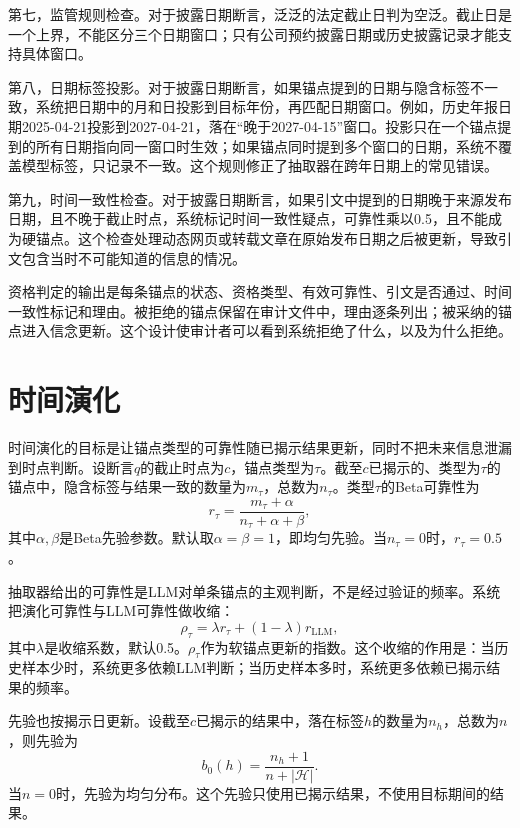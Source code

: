 第七，监管规则检查。对于披露日期断言，泛泛的法定截止日判为空泛。截止日是一个上界，不能区分三个日期窗口；只有公司预约披露日期或历史披露记录才能支持具体窗口。

第八，日期标签投影。对于披露日期断言，如果锚点提到的日期与隐含标签不一致，系统把日期中的月和日投影到目标年份，再匹配日期窗口。例如，历史年报日期2025-04-21投影到2027-04-21，落在“晚于2027-04-15”窗口。投影只在一个锚点提到的所有日期指向同一窗口时生效；如果锚点同时提到多个窗口的日期，系统不覆盖模型标签，只记录不一致。这个规则修正了抽取器在跨年日期上的常见错误。

第九，时间一致性检查。对于披露日期断言，如果引文中提到的日期晚于来源发布日期，且不晚于截止时点，系统标记时间一致性疑点，可靠性乘以0.5，且不能成为硬锚点。这个检查处理动态网页或转载文章在原始发布日期之后被更新，导致引文包含当时不可能知道的信息的情况。

资格判定的输出是每条锚点的状态、资格类型、有效可靠性、引文是否通过、时间一致性标记和理由。被拒绝的锚点保留在审计文件中，理由逐条列出；被采纳的锚点进入信念更新。这个设计使审计者可以看到系统拒绝了什么，以及为什么拒绝。

\section{时间演化}

时间演化的目标是让锚点类型的可靠性随已揭示结果更新，同时不把未来信息泄漏到时点判断。设断言$q$的截止时点为$c$，锚点类型为$\tau$。截至$c$已揭示的、类型为$\tau$的锚点中，隐含标签与结果一致的数量为$m_\tau$，总数为$n_\tau$。类型$\tau$的Beta可靠性为
\begin{equation}
r_\tau=\frac{m_\tau+\alpha}{n_\tau+\alpha+\beta},
\label{eq:beta}
\end{equation}
其中$\alpha,\beta$是Beta先验参数。默认取$\alpha=\beta=1$，即均匀先验。当$n_\tau=0$时，$r_\tau=0.5$。

抽取器给出的可靠性是LLM对单条锚点的主观判断，不是经过验证的频率。系统把演化可靠性与LLM可靠性做收缩：
\begin{equation}
\rho_\tau=\lambda r_\tau+(1-\lambda)r_{\mathrm{LLM}},
\label{eq:shrink}
\end{equation}
其中$\lambda$是收缩系数，默认0.5。$\rho_\tau$作为软锚点更新的指数。这个收缩的作用是：当历史样本少时，系统更多依赖LLM判断；当历史样本多时，系统更多依赖已揭示结果的频率。

先验也按揭示日更新。设截至$c$已揭示的结果中，落在标签$h$的数量为$n_h$，总数为$n$，则先验为
\begin{equation}
b_0(h)=\frac{n_h+1}{n+|\mathcal H|}.
\label{eq:prior}
\end{equation}
当$n=0$时，先验为均匀分布。这个先验只使用已揭示结果，不使用目标期间的结果。

